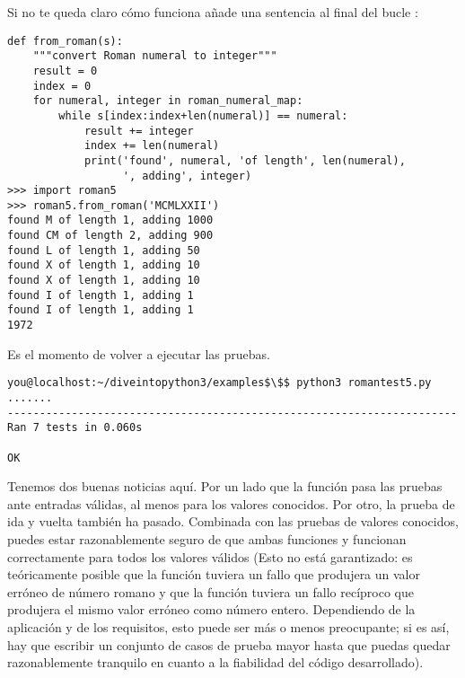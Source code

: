 Si no te queda claro cómo funciona  añade una sentencia  al final del bucle :

\noindent\begin{minipage}{\textwidth}
\begin{lstlisting}[mathescape=True]
def from_roman(s):
    """convert Roman numeral to integer"""
    result = 0
    index = 0
    for numeral, integer in roman_numeral_map:
        while s[index:index+len(numeral)] == numeral:
            result += integer
            index += len(numeral)
            print('found', numeral, 'of length', len(numeral),
                  ', adding', integer)
>>> import roman5
>>> roman5.from_roman('MCMLXXII')
found M of length 1, adding 1000
found CM of length 2, adding 900
found L of length 1, adding 50
found X of length 1, adding 10
found X of length 1, adding 10
found I of length 1, adding 1
found I of length 1, adding 1
1972
\end{lstlisting}
\end{minipage}

Es el momento de volver a ejecutar las pruebas.

\noindent\begin{minipage}{\textwidth}
\begin{lstlisting}[mathescape=True]
you@localhost:~/diveintopython3/examples$\$$ python3 romantest5.py
.......
----------------------------------------------------------------------
Ran 7 tests in 0.060s

OK
\end{lstlisting}
\end{minipage}

Tenemos dos buenas noticias aquí. Por un lado que la función  pasa las pruebas ante entradas válidas, al menos para los valores conocidos. Por otro, la prueba de ida y vuelta también ha pasado. Combinada con las pruebas de valores conocidos, puedes estar razonablemente seguro de que ambas funciones  y  funcionan correctamente para todos los valores válidos (Esto no está garantizado: es teóricamente posible que la función  tuviera un fallo que produjera un valor erróneo de número romano y que la función  tuviera un fallo recíproco que produjera el mismo valor erróneo como número entero. Dependiendo de la aplicación y de los requisitos, esto puede ser más o menos preocupante; si es así, hay que escribir un conjunto de casos de prueba mayor hasta que puedas quedar razonablemente tranquilo en cuanto a la fiabilidad del código desarrollado).

